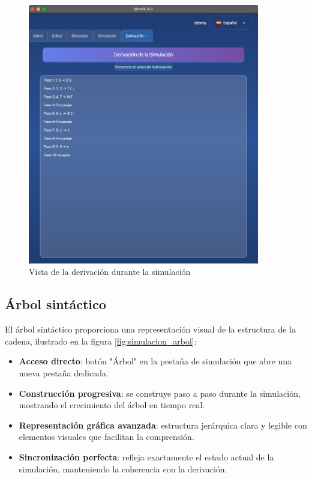 \needspace{8cm}
\begin{figure}[H]
    \centering
    \includegraphics[width=0.9\textwidth]{figuras/simulador/simulacion_derivacion.png}
    \caption{Vista de la derivación durante la simulación}
    \label{fig:simulacion_derivacion}
\end{figure}

\subsection{Árbol sintáctico}

El árbol sintáctico proporciona una representación visual de la estructura de la cadena, ilustrado en la figura \ref{fig:simulacion_arbol}:

\begin{itemize}
    \item \textbf{Acceso directo}: botón \string"Árbol\string" en la pestaña de simulación que abre una nueva pestaña dedicada.
    \item \textbf{Construcción progresiva}: se construye paso a paso durante la simulación, mostrando el crecimiento del árbol en tiempo real.
    \item \textbf{Representación gráfica avanzada}: estructura jerárquica clara y legible con elementos visuales que facilitan la comprensión.
    \item \textbf{Sincronización perfecta}: refleja exactamente el estado actual de la simulación, manteniendo la coherencia con la derivación.
\end{itemize}

